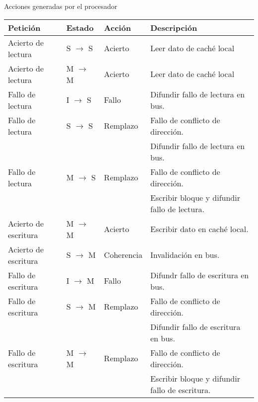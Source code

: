 \begin{frame}[t,shrink=5]{Acciones generadas por el procesador}

{\scriptsize
\begin{tabular}{l|l|l|l}

Petición & Estado & Acción & Descripción \\
\hline
\hline

\pause Acierto de lectura &
S $\rightarrow$ S &
Acierto &
Leer dato de caché local
\\
\hline

\pause Acierto de lectura &
M $\rightarrow$ M &
Acierto &
Leer dato de caché local
\\
\hline

\pause Fallo de lectura & 
I $\rightarrow$ S &
Fallo &
Difundir fallo de lectura en bus.
\\
\hline

\pause Fallo de lectura &
S $\rightarrow$ S &
Remplazo &
Fallo de conflicto de dirección. 
\\

& & &
Difundir fallo de lectura en bus. 
\\
\hline

\pause Fallo de lectura &
M $\rightarrow$ S &
Remplazo &
Fallo de conflicto de dirección. 
\\

& & &
Escribir bloque y difundir fallo de lectura.
\\
\hline

\pause Acierto de escritura &
M $\rightarrow$ M &
Acierto &
Escribir dato en caché local.
\\
\hline

\pause Acierto de escritura &
S $\rightarrow$ M &
Coherencia &
Invalidación en bus.
\\
\hline

\pause Fallo de escritura &
I $\rightarrow$ M &
Fallo &
Difundr fallo de escritura en bus.
\\
\hline

\pause Fallo de escritura &
S $\rightarrow$ M &
Remplazo &
Fallo de conflicto de dirección. 
\\

& & &
Difundir fallo de escritura en bus.
\\
\hline

\pause Fallo de escritura &
M $\rightarrow$ M &
Remplazo &
Fallo de conflicto de dirección. 
\\

& & &
Escribir bloque y difundir fallo de escritura.
\\
\hline

\end{tabular}
}
\end{frame}


